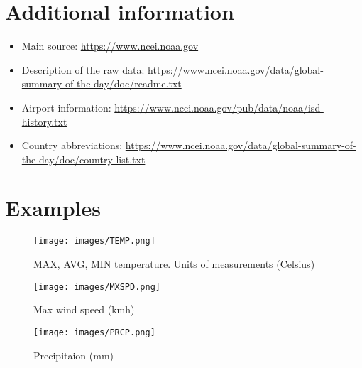 \documentclass[11pt]{article}
\begin{document}
\section{Additional information}
\begin{itemize}
	\item Main source: \url{https://www.ncei.noaa.gov}
	\item Description of the raw data: \url{https://www.ncei.noaa.gov/data/global-summary-of-the-day/doc/readme.txt}
	\item Airport information: \url{https://www.ncei.noaa.gov/pub/data/noaa/isd-history.txt}
	\item Country abbreviations: \url{https://www.ncei.noaa.gov/data/global-summary-of-the-day/doc/country-list.txt}
\end{itemize}
\section{Examples}
\begin{figure}[H]
\centering
\texttt{[image: images/TEMP.png]}
\caption{MAX, AVG, MIN temperature. Units of measurements (Celsius)}
\end{figure}
\begin{figure}[H]
\centering
\texttt{[image: images/MXSPD.png]}
\caption{Max wind speed (kmh)}
\end{figure}
\begin{figure}[H]
\centering
\texttt{[image: images/PRCP.png]}
\caption{Precipitaion (mm)}
\end{figure}
\end{document}
